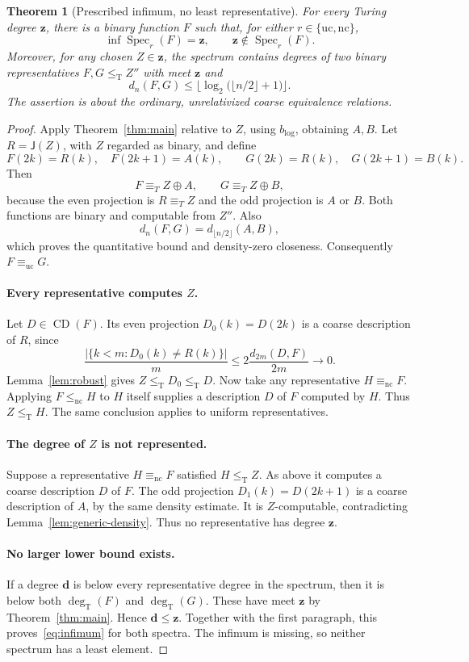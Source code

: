\documentclass[11pt,a4paper]{article}
\newcommand{\leT}{\leq_{\mathrm T}}
\newcommand{\degT}{\operatorname{deg}_{\mathrm T}}
\newcommand{\CD}{\operatorname{CD}}
\newcommand{\Spec}{\operatorname{Spec}}
\newcommand{\nc}{\mathrm{nc}}
\newcommand{\uc}{\mathrm{uc}}
\newcommand{\dd}{\mathbf d}
\newcommand{\zz}{\mathbf z}
\newcommand{\J}{\mathsf J}
\newcommand{\bblog}{b_{\log}}
\newtheorem{theorem}{Theorem}[section]
\theoremstyle{definition}\newtheorem{definition}[theorem]{Definition}
\theoremstyle{remark}\newtheorem{remark}[theorem]{Remark}
\begin{document}
\begin{theorem}[Prescribed infimum, no least representative]
\label{thm:infimum}
For every Turing degree $\zz$, there is a binary function $F$ such that, for either $r\in\{\uc,\nc\}$,
\begin{equation}\label{eq:infimum}
              \inf\Spec_r(F)=\zz,
                  \qquad \zz\notin\Spec_r(F).
\end{equation}
Moreover, for any chosen $Z\in\zz$, the spectrum contains degrees of two binary representatives $F,G\leT Z''$ with meet $\zz$ and
\[
 d_n(F,G)\le\Big\lfloor\log_2\bigl(\lfloor n/2\rfloor+1\bigr)\Big\rfloor.
\]
The assertion is about the ordinary, unrelativized coarse equivalence relations.
\end{theorem}
\begin{proof}
Apply Theorem~\ref{thm:main} relative to $Z$, using $\bblog$, obtaining $A,B$. Let $R=\J(Z)$, with $Z$ regarded as binary, and define
\[
   F(2k)=R(k),\quad F(2k+1)=A(k),\qquad
   G(2k)=R(k),\quad G(2k+1)=B(k).
\]
Then
\[
 F\equiv_T Z\oplus A,\qquad G\equiv_T Z\oplus B,
\]
because the even projection is $R\equiv_T Z$ and the odd projection is $A$ or $B$. Both functions are binary and computable from $Z''$. Also
\[
               d_n(F,G)=d_{\lfloor n/2\rfloor}(A,B),
\]
which proves the quantitative bound and density-zero closeness. Consequently $F\equiv_\uc G$.

\paragraph{Every representative computes $Z$.}
Let $D\in\CD(F)$. Its even projection $D_0(k)=D(2k)$ is a coarse description of $R$, since
\[
 \frac{|\{k<m:D_0(k)\ne R(k)\}|}{m}
            \le 2\frac{d_{2m}(D,F)}{2m}\longrightarrow0.
\]
Lemma~\ref{lem:robust} gives $Z\leT D_0\leT D$. Now take any representative $H\equiv_\nc F$. Applying $F\le_\nc H$ to $H$ itself supplies a description $D$ of $F$ computed by $H$. Thus $Z\leT H$. The same conclusion applies to uniform representatives.

\paragraph{The degree of $Z$ is not represented.}
Suppose a representative $H\equiv_\nc F$ satisfied $H\leT Z$. As above it computes a coarse description $D$ of $F$. The odd projection $D_1(k)=D(2k+1)$ is a coarse description of $A$, by the same density estimate. It is $Z$-computable, contradicting Lemma~\ref{lem:generic-density}. Thus no representative has degree $\zz$.

\paragraph{No larger lower bound exists.}
If a degree $\dd$ is below every representative degree in the spectrum, then it is below both $\degT(F)$ and $\degT(G)$. These have meet $\zz$ by Theorem~\ref{thm:main}. Hence $\dd\le\zz$. Together with the first paragraph, this proves~\eqref{eq:infimum} for both spectra. The infimum is missing, so neither spectrum has a least element.
\end{proof}
\end{document}
